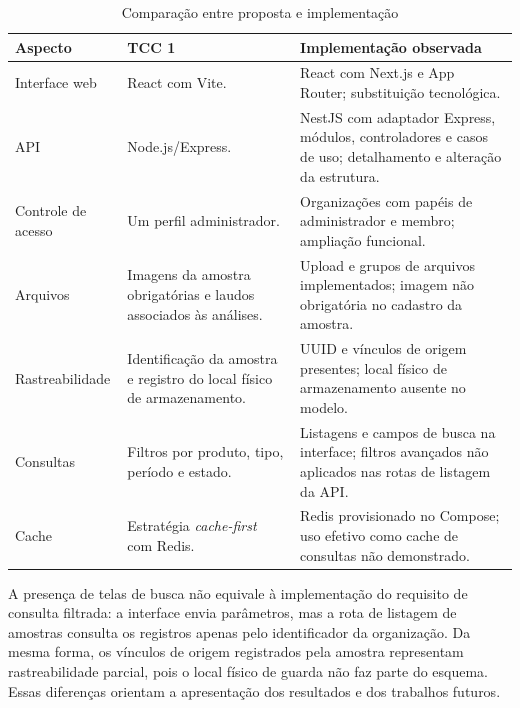 \begin{table}[htbp]
\centering
\caption{Comparação entre proposta e implementação}
\label{tab:comparacao}
\small
\begin{tabular}{|p{2.7cm}|p{5.2cm}|p{5.2cm}|}
\hline
\textbf{Aspecto} & \textbf{TCC 1} & \textbf{Implementação observada} \\ \hline
Interface web & React com Vite. & React com Next.js e App Router; substituição tecnológica. \\ \hline
API & Node.js/Express. & NestJS com adaptador Express, módulos, controladores e casos de uso; detalhamento e alteração da estrutura. \\ \hline
Controle de acesso & Um perfil administrador. & Organizações com papéis de administrador e membro; ampliação funcional. \\ \hline
Arquivos & Imagens da amostra obrigatórias e laudos associados às análises. & Upload e grupos de arquivos implementados; imagem não obrigatória no cadastro da amostra. \\ \hline
Rastreabilidade & Identificação da amostra e registro do local físico de armazenamento. & UUID e vínculos de origem presentes; local físico de armazenamento ausente no modelo. \\ \hline
Consultas & Filtros por produto, tipo, período e estado. & Listagens e campos de busca na interface; filtros avançados não aplicados nas rotas de listagem da API. \\ \hline
Cache & Estratégia \textit{cache-first} com Redis. & Redis provisionado no Compose; uso efetivo como cache de consultas não demonstrado. \\ \hline
\end{tabular}
\end{table}

A presença de telas de busca não equivale à implementação do requisito de consulta filtrada: a interface envia parâmetros, mas a rota de listagem de amostras consulta os registros apenas pelo identificador da organização. Da mesma forma, os vínculos de origem registrados pela amostra representam rastreabilidade parcial, pois o local físico de guarda não faz parte do esquema. Essas diferenças orientam a apresentação dos resultados e dos trabalhos futuros.
